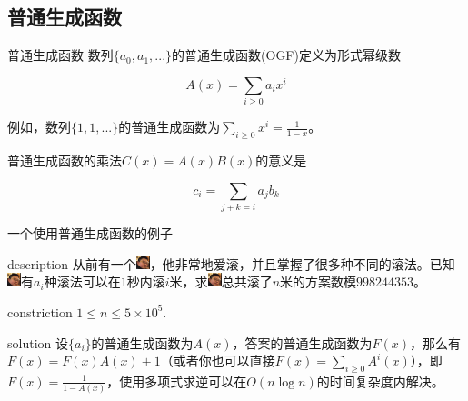 \documentclass{beamer}
\begin{document}
	\subsection{普通生成函数}
	\begin{frame}{普通生成函数}
		数列$\{a_0,a_1,...\}$的普通生成函数(OGF)定义为形式幂级数
		
		$$A(x)=\sum_{i\ge 0}a_ix^i$$
		
		例如，数列$\{1,1,...\}$的普通生成函数为$\sum_{i\ge 0}x^i=\frac{1}{1-x}$。

		普通生成函数的乘法$C(x)=A(x)B(x)$的意义是
		
		$$c_i=\sum_{j+k=i}a_jb_k$$
	\end{frame}
	\begin{frame}{一个使用普通生成函数的例子}
		\begin{block}{description}
			从前有一个\includegraphics[width=0.4cm]{o_xzz.jpg}，他非常地爱滚，并且掌握了很多种不同的滚法。已知\includegraphics[width=0.4cm]{o_xzz.jpg}有$a_i$种滚法可以在$1$秒内滚$i$米，求\includegraphics[width=0.4cm]{o_xzz.jpg}总共滚了$n$米的方案数模$998244353$。
		\end{block}
		\begin{block}{constriction}
			$1 \le n \le 5\times 10^5.$
		\end{block}
		\pause
		\begin{block}{solution}
			设$\{a_i\}$的普通生成函数为$A(x)$，答案的普通生成函数为$F(x)$，那么有$F(x)=F(x)A(x)+1$（或者你也可以直接$F(x)=\sum_{i \ge 0}A^i(x)$），即$F(x)=\frac{1}{1-A(x)}$，使用多项式求逆可以在$O(n\log n)$的时间复杂度内解决。
		\end{block}
	\end{frame}
\end{document}
